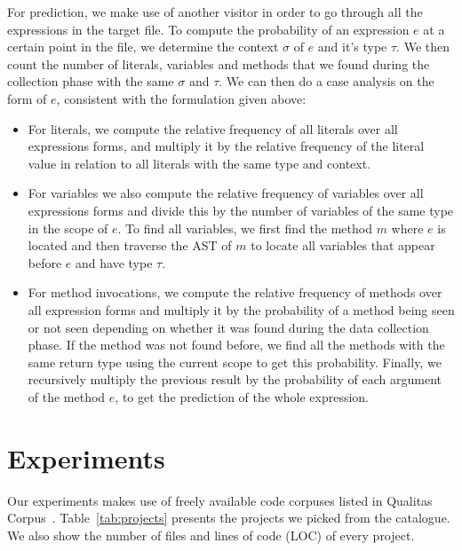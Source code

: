 \documentclass{article} %
\begin{document}
For prediction, we make use of another visitor in order to go through all the expressions in the target file. To compute the probability of an expression $e$ at a certain point in the file, we determine the context $\sigma$ of $e$ and it's type $\tau$. We
then count the number of literals, variables and methods that we found during the collection phase with the same $\sigma$ and $\tau$. We can then do a case analysis on the form of $e$, consistent with the formulation given above:

\begin{itemize}
   \item For literals, we compute the relative frequency of all literals over all expressions forms, and multiply it by the relative frequency of the literal value in relation to all literals with the same type and context.
   \item For variables we also compute the relative frequency of variables over all expressions forms and divide this by the number of variables of the same type in the scope of $e$. To find all variables, we first find the method $m$ where $e$ is located and then traverse the AST of $m$ to locate all variables that appear before $e$ and have type $\tau$.
   \item For method invocations, we compute the relative frequency of methods over all expression forms and multiply it by the probability of a method being seen or not seen depending  on whether it was found during the data collection phase. If the method was not found before, we find all the methods with the same return type using the current scope to get this probability. Finally, we recursively multiply the previous result by the probability of each argument of the method $e$, to get the prediction of the whole expression.
\end{itemize}

\section*{Experiments}


Our experiments makes use of freely available code corpuses listed in Qualitas Corpus~\cite{QualitasCorpus:APSEC:2010}.
Table~\ref{tab:projects} presents the projects we picked from the catalogue. We also show the number of files and
lines of code (LOC) of every project.
\end{document}

